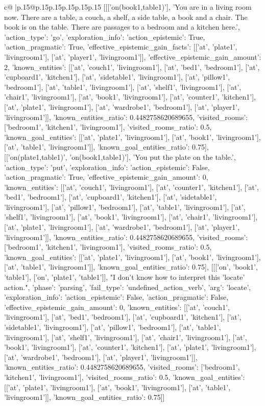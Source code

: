\documentclass{article}
\begin{document}
{\begin{supertabular}{c@{$\;$}|p{.15\linewidth}@{}p{.15\linewidth}p{.15\linewidth}p{.15\linewidth}p{.15\linewidth}p{.15\linewidth}}
{{{	 [[['on(book1,table1)'], 'You are in a living room now. There are a table, a couch, a shelf, a side table, a book and a chair. The book is on the table. There are passages to a bedroom and a kitchen here.', {'action_type': 'go', 'exploration_info': {'action_epistemic': True, 'action_pragmatic': True, 'effective_epistemic_gain_facts': [['at', 'plate1', 'livingroom1'], ['at', 'player1', 'livingroom1']], 'effective_epistemic_gain_amount': 2, 'known_entities': [['at', 'couch1', 'livingroom1'], ['at', 'bed1', 'bedroom1'], ['at', 'cupboard1', 'kitchen1'], ['at', 'sidetable1', 'livingroom1'], ['at', 'pillow1', 'bedroom1'], ['at', 'table1', 'livingroom1'], ['at', 'shelf1', 'livingroom1'], ['at', 'chair1', 'livingroom1'], ['at', 'book1', 'livingroom1'], ['at', 'counter1', 'kitchen1'], ['at', 'plate1', 'livingroom1'], ['at', 'wardrobe1', 'bedroom1'], ['at', 'player1', 'livingroom1']], 'known_entities_ratio': 0.4482758620689655, 'visited_rooms': ['bedroom1', 'kitchen1', 'livingroom1'], 'visited_rooms_ratio': 0.5, 'known_goal_entities': [['at', 'plate1', 'livingroom1'], ['at', 'book1', 'livingroom1'], ['at', 'table1', 'livingroom1']], 'known_goal_entities_ratio': 0.75}}], [['on(plate1,table1)', 'on(book1,table1)'], 'You put the plate on the table.', {'action_type': 'put', 'exploration_info': {'action_epistemic': False, 'action_pragmatic': True, 'effective_epistemic_gain_amount': 0, 'known_entities': [['at', 'couch1', 'livingroom1'], ['at', 'counter1', 'kitchen1'], ['at', 'bed1', 'bedroom1'], ['at', 'cupboard1', 'kitchen1'], ['at', 'sidetable1', 'livingroom1'], ['at', 'pillow1', 'bedroom1'], ['at', 'table1', 'livingroom1'], ['at', 'shelf1', 'livingroom1'], ['at', 'book1', 'livingroom1'], ['at', 'chair1', 'livingroom1'], ['at', 'plate1', 'livingroom1'], ['at', 'wardrobe1', 'bedroom1'], ['at', 'player1', 'livingroom1']], 'known_entities_ratio': 0.4482758620689655, 'visited_rooms': ['bedroom1', 'kitchen1', 'livingroom1'], 'visited_rooms_ratio': 0.5, 'known_goal_entities': [['at', 'plate1', 'livingroom1'], ['at', 'book1', 'livingroom1'], ['at', 'table1', 'livingroom1']], 'known_goal_entities_ratio': 0.75}}], [[['on', 'book1', 'table1'], ['on', 'plate1', 'table1']], "I don't know how to interpret this 'locate' action.", {'phase': 'parsing', 'fail_type': 'undefined_action_verb', 'arg': 'locate', 'exploration_info': {'action_epistemic': False, 'action_pragmatic': False, 'effective_epistemic_gain_amount': 0, 'known_entities': [['at', 'couch1', 'livingroom1'], ['at', 'bed1', 'bedroom1'], ['at', 'cupboard1', 'kitchen1'], ['at', 'sidetable1', 'livingroom1'], ['at', 'pillow1', 'bedroom1'], ['at', 'table1', 'livingroom1'], ['at', 'shelf1', 'livingroom1'], ['at', 'chair1', 'livingroom1'], ['at', 'book1', 'livingroom1'], ['at', 'counter1', 'kitchen1'], ['at', 'plate1', 'livingroom1'], ['at', 'wardrobe1', 'bedroom1'], ['at', 'player1', 'livingroom1']], 'known_entities_ratio': 0.4482758620689655, 'visited_rooms': ['bedroom1', 'kitchen1', 'livingroom1'], 'visited_rooms_ratio': 0.5, 'known_goal_entities': [['at', 'plate1', 'livingroom1'], ['at', 'book1', 'livingroom1'], ['at', 'table1', 'livingroom1']], 'known_goal_entities_ratio': 0.75}}]] 
}}}
\end{supertabular}}
\end{document}

